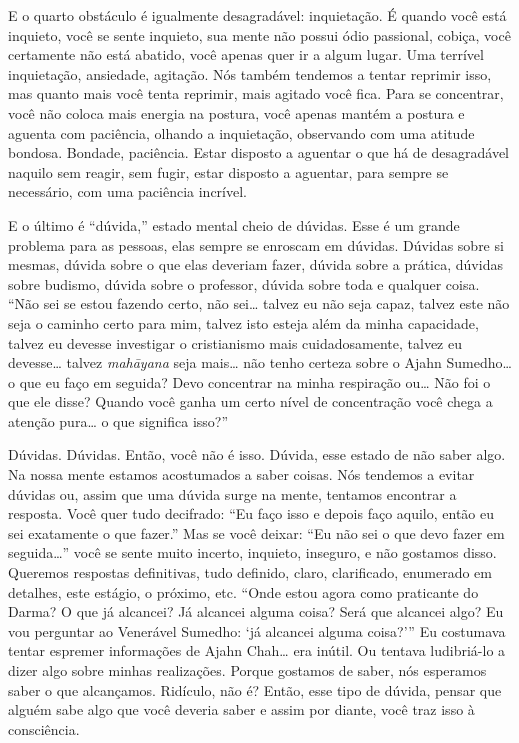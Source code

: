 E o quarto obstáculo é igualmente desagradável: inquietação. É
quando você está inquieto, você se sente inquieto, sua mente não possui
ódio passional, cobiça, você certamente não está abatido, você apenas
quer ir a algum lugar. Uma terrível inquietação, ansiedade, agitação.
Nós também tendemos a tentar reprimir isso, mas quanto mais você tenta
reprimir, mais agitado você fica. Para se concentrar, você não coloca
mais energia na postura, você apenas mantém a postura e aguenta com
paciência, olhando a inquietação, observando com uma atitude bondosa.
Bondade, paciência. Estar disposto a aguentar o que há de desagradável
naquilo sem reagir, sem fugir, estar disposto a aguentar, para sempre
se necessário, com uma paciência incrível.

E o último é “dúvida,” estado mental cheio de dúvidas. Esse é um
grande problema para as pessoas, elas sempre se enroscam em dúvidas.
Dúvidas sobre si mesmas, dúvida sobre o que elas deveriam fazer, dúvida
sobre a prática, dúvidas sobre budismo, dúvida sobre o professor,
dúvida sobre toda e qualquer coisa. “Não sei se estou fazendo certo,
não sei\ldots{} talvez eu não seja capaz, talvez este não seja o caminho certo
para mim, talvez isto esteja além da minha capacidade, talvez eu
devesse investigar o cristianismo mais cuidadosamente, talvez eu
devesse\ldots{} talvez \emph{mahāyana} seja mais\ldots{} não tenho certeza sobre
o Ajahn Sumedho\ldots{} o que eu faço em seguida? Devo concentrar na minha
respiração ou\ldots{} Não foi o que ele disse? Quando você ganha um certo
nível de concentração você chega a atenção pura\ldots{} o que significa isso?”

Dúvidas. Dúvidas. Então, você não é isso. Dúvida, esse estado de não
saber algo. Na nossa mente estamos acostumados a saber coisas. Nós
tendemos a evitar dúvidas ou, assim que uma dúvida surge na mente,
tentamos encontrar a resposta. Você quer tudo decifrado: “Eu faço isso
e depois faço aquilo, então eu sei exatamente o que fazer.” Mas se você
deixar: “Eu não sei o que devo fazer em seguida\ldots{}” você se sente muito
incerto, inquieto, inseguro, e não gostamos disso. Queremos respostas
definitivas, tudo definido, claro, clarificado, enumerado em detalhes,
este estágio, o próximo, etc. “Onde estou agora como praticante do
Darma? O que já alcancei? Já alcancei alguma coisa? Será que alcancei
algo? Eu vou perguntar ao Venerável Sumedho: ‘já alcancei alguma
coisa?’” Eu costumava tentar espremer informações de Ajahn Chah\ldots{} era
inútil. Ou tentava ludibriá-lo a dizer algo sobre minhas realizações.
Porque gostamos de saber, nós esperamos saber o que alcançamos.
Ridículo, não é? Então, esse tipo de dúvida, pensar que alguém sabe
algo que você deveria saber e assim por diante, você traz isso à
consciência. 

